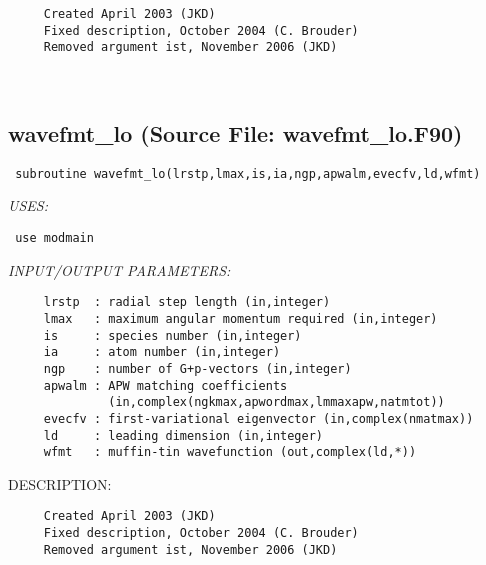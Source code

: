 \documentclass[11pt]{article}
\begin{document}
  
\begin{verbatim}     Created April 2003 (JKD)
     Fixed description, October 2004 (C. Brouder)
     Removed argument ist, November 2006 (JKD)\end{verbatim}


 
 
\mbox{}\hrulefill\ 
 
\subsection{wavefmt\_lo (Source File: wavefmt\_lo.F90)}


\begin{verbatim} subroutine wavefmt_lo(lrstp,lmax,is,ia,ngp,apwalm,evecfv,ld,wfmt)\end{verbatim}{\em USES:}
\begin{verbatim} use modmain\end{verbatim}{\em INPUT/OUTPUT PARAMETERS:}
\begin{verbatim}     lrstp  : radial step length (in,integer)
     lmax   : maximum angular momentum required (in,integer)
     is     : species number (in,integer)
     ia     : atom number (in,integer)
     ngp    : number of G+p-vectors (in,integer)
     apwalm : APW matching coefficients
              (in,complex(ngkmax,apwordmax,lmmaxapw,natmtot))
     evecfv : first-variational eigenvector (in,complex(nmatmax))
     ld     : leading dimension (in,integer)
     wfmt   : muffin-tin wavefunction (out,complex(ld,*))\end{verbatim}
{\sf DESCRIPTION:\\ }


  
\begin{verbatim}     Created April 2003 (JKD)
     Fixed description, October 2004 (C. Brouder)
     Removed argument ist, November 2006 (JKD)\end{verbatim}


 
 
\mbox{}\hrulefill\ 
 
\end{document}
